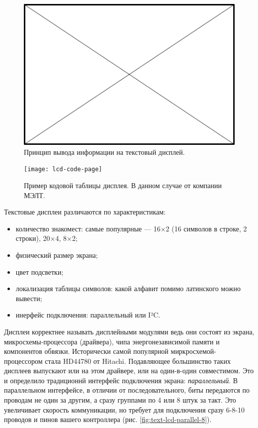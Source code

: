 \begin{figure}
  \centering
  \includegraphics{TODO}
  \caption{Принцип вывода информации на текстовый дисплей.}
\end{figure}

\begin{figure}
  \centering
  \texttt{[image: lcd-code-page]}
  \caption{Пример кодовой таблицы дисплея. В данном случае от компании МЭЛТ.}
  \label{fig:text-lcd-code-page}
\end{figure}

Текстовые дисплеи различаются по характеристикам:

\begin{itemize}
  \item количество знакомест: самые популярные — 16×2 (16 символов в строке, 2 строки), 20×4, 8×2;
  \item физический размер экрана;
  \item цвет подсветки;
  \item локализация таблицы символов: какой алфавит помимо латинского можно вывести;
  \item инерфейс подключения: параллельный или I²C.
\end{itemize}

Дисплеи корректнее называть дисплейными модулями ведь они состоят из экрана, микросхемы-процессора (драйвера), чипа энергонезависимой памяти и компонентов обвязки. Исторически самой популярной миркросхемой-процессором стала HD44780 от Hitachi. Подавляющее большинство таких дисплеев выпускают или на этом драйвере, или на один-в-один совместимом. Это и определило традиционнй интерфейс подключения экрана: \emph{параллельный}. В параллельном интерфейсе, в отличии от последовательного, биты передаются по проводам не один за другим, а сразу группами по 4 или 8 штук за такт. Это увеличивает скорость коммуникации, но требует для подключения сразу 6-8-10 проводов и пинов вашего контроллера (рис. \ref{fig:text-lcd-parallel-8}).

